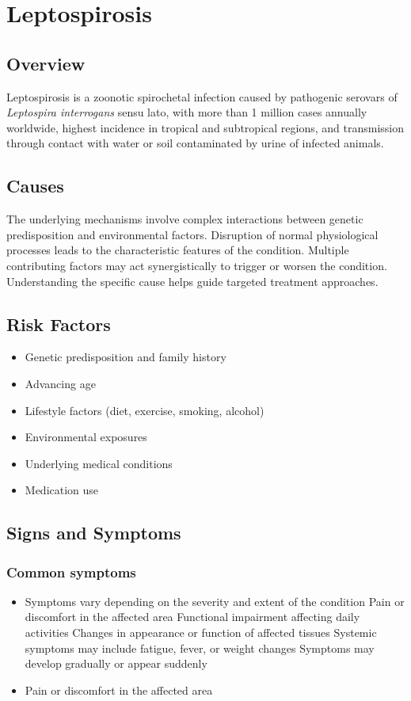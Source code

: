 \chapter{Leptospirosis}
\label{sec:Leptospirosis}

\section{Overview}
Leptospirosis is a zoonotic spirochetal infection caused by pathogenic serovars of \textit{Leptospira interrogans} sensu lato, with more than 1 million cases annually worldwide, highest incidence in tropical and subtropical regions, and transmission through contact with water or soil contaminated by urine of infected animals.
\section{Causes}
The underlying mechanisms involve complex interactions between genetic predisposition and environmental factors. Disruption of normal physiological processes leads to the characteristic features of the condition. Multiple contributing factors may act synergistically to trigger or worsen the condition. Understanding the specific cause helps guide targeted treatment approaches.
\section{Risk Factors}


\begin{itemize}[noitemsep]
  \item Genetic predisposition and family history
  \item Advancing age
  \item Lifestyle factors (diet, exercise, smoking, alcohol)
  \item Environmental exposures
  \item Underlying medical conditions
  \item Medication use
\end{itemize}
\section{Signs and Symptoms}

\subsection{Common symptoms}
\begin{itemize}[noitemsep]
  \item Symptoms vary depending on the severity and extent of the condition Pain or discomfort in the affected area Functional impairment affecting daily activities Changes in appearance or function of affected tissues Systemic symptoms may include fatigue, fever, or weight changes Symptoms may develop gradually or appear suddenly
  \item Pain or discomfort in the affected area
  \end{itemize}

